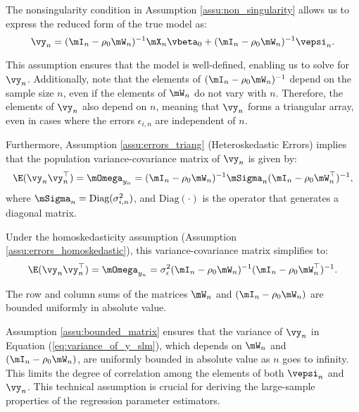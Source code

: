 The nonsingularity condition in Assumption \ref{assu:non_singularity} allows us to express the reduced form of the true model as:
\begin{equation*}
  \vy_n = (\mI_n - \rho_0\mW_n)^{-1}\mX_n\vbeta_0 + (\mI_n - \rho_0\mW_n)^{-1}\vepsi_n.
\end{equation*}

This assumption ensures that the model is well-defined, enabling us to solve for $\vy_n$. Additionally, \cite{kelejian1998generalized} note that the elements of $(\mI_n - \rho_0\mW_n)^{-1}$ depend on the sample size $n$, even if the elements of $\mW_n$ do not vary with $n$. Therefore, the elements of $\vy_n$ also depend on $n$, meaning that $\vy_n$ forms a triangular array, even in cases where the errors $\epsilon_{i,n}$ are independent of $n$. 

Furthermore, Assumption \ref{assu:errors_triang} (Heteroskedastic Errors) implies that the population variance-covariance matrix of $\vy_n$ is given by:
\begin{equation}\label{eq:variance_of_y_slm}
  \E(\vy_n\vy^\top_n) = \mOmega_{y_n}= (\mI_n - \rho_0\mW_n)^{-1}\mSigma_n(\mI_n - \rho_0\mW^\top_n)^{-1},
\end{equation}
%
where $\mSigma_n = \textrm{Diag}(\sigma^2_{i, n})$, and $\textrm{Diag}(\cdot)$ is the operator that generates a diagonal matrix. 

Under the homoskedasticity assumption (Assumption \ref{assu:errors_homoskedastic}), this variance-covariance matrix simplifies to:
\begin{equation}\label{eq:variance_of_y_slm-homo}
  \E(\vy_n\vy^\top_n) = \mOmega_{y_n} = \sigma^2_{\epsilon}(\mI_n - \rho_0\mW_n)^{-1}(\mI_n - \rho_0\mW^\top_n)^{-1}.
\end{equation}

\begin{assumption}\label{assu:bounded_matrix}
The row and column sums of the matrices $\mW_n$ and $(\mI_n - \rho_0\mW_n)$ are bounded uniformly in absolute value.
\end{assumption}


Assumption \ref{assu:bounded_matrix} ensures that the variance of $\vy_n$  in Equation (\ref{eq:variance_of_y_slm}), which depends on $\mW_n$ and $(\mI_n - \rho_0\mW_n)$, are uniformly bounded in absolute value as $n$ goes to infinity.  This limits the degree of correlation among the elements of both $\vepsi_n$ and $\vy_n$. This technical assumption is crucial for deriving the large-sample properties of the regression parameter estimators. 

